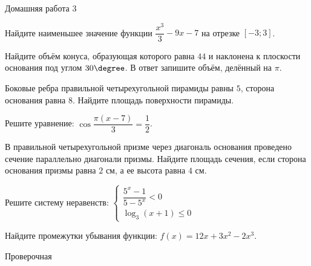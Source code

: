 \begin{homework}[number=3]
	\begin{listofex}
		\item Домашняя работа 3
	\end{listofex}
\end{homework}

\begin{class}[number=10]
	\begin{listofex}
		\item Найдите наименьшее значение функции \( \dfrac{x^3}{3}-9x-7 \) на отрезке \( [-3;3] \).
		\item Найдите объём конуса, образующая которого равна \( 44 \) и наклонена к плоскости основания под углом \( 30\degree \). В ответ запишите объём, делённый на \( \pi \).
		\item Боковые ребра правильной четырехугольной пирамиды равны \( 5 \), сторона основания равна \( 8 \). Найдите площадь поверхности пирамиды.
		\item Решите уравнение: \( \cos\dfrac{\pi(x-7)}{3}=\dfrac{1}{2} \).
		\item В правильной четырехугольной призме через диагональ основания проведено сечение параллельно диагонали призмы. Найдите площадь сечения, если сторона основания призмы равна \( 2 \) см, а ее высота равна \( 4 \) см.
		\item Решите систему неравенств:
		\( \begin{cases} \dfrac{5^x-1}{5-5^x}<0 \\ \log_3(x+1)\le0 \end{cases} \)
		\item Найдите промежутки убывания функции: \( f(x)=12x+3x^2-2x^3 \).
	\end{listofex}
\end{class}

\begin{exam}
	\begin{listofex}
		\item Проверочная
	\end{listofex}
\end{exam}
